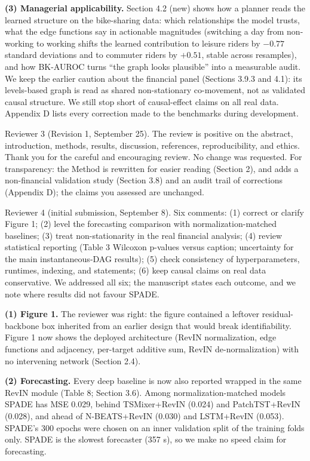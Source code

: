 \textbf{(3) Managerial applicability.} Section 4.2 (new) shows how a planner reads the learned structure on the bike-sharing data: which relationships the model trusts, what the edge functions say in actionable magnitudes (switching a day from non-working to working shifts the learned contribution to leisure riders by $-0.77$ standard deviations and to commuter riders by $+0.51$, stable across resamples), and how BK-AUROC turns ``the graph looks plausible'' into a measurable audit. We keep the earlier caution about the financial panel (Sections 3.9.3 and 4.1): its levels-based graph is read as shared non-stationary co-movement, not as validated causal structure. We still stop short of causal-effect claims on all real data. Appendix D lists every correction made to the benchmarks during development.
\item[R3] Reviewer 3 (Revision 1, September 25). The review is positive on the abstract, introduction, methods, results, discussion, references, reproducibility, and ethics.
Thank you for the careful and encouraging review. No change was requested. For transparency: the Method is rewritten for easier reading (Section 2), and adds a non-financial validation study (Section 3.8) and an audit trail of corrections (Appendix D); the claims you assessed are unchanged.
\item[R4] Reviewer 4 (initial submission, September 8). Six comments: (1) correct or clarify Figure 1; (2) level the forecasting comparison with normalization-matched baselines; (3) treat non-stationarity in the real financial analysis; (4) review statistical reporting (Table 3 Wilcoxon p-values versus caption; uncertainty for the main instantaneous-DAG results); (5) check consistency of hyperparameters, runtimes, indexing, and statements; (6) keep causal claims on real data conservative.
We addressed all six; the manuscript states each outcome, and we note where results did not favour SPADE.

\textbf{(1) Figure 1.} The reviewer was right: the figure contained a leftover residual-backbone box inherited from an earlier design that would break identifiability. Figure 1 now shows the deployed architecture (RevIN normalization, edge functions and adjacency, per-target additive sum, RevIN de-normalization) with no intervening network (Section 2.4).

\textbf{(2) Forecasting.} Every deep baseline is now also reported wrapped in the same RevIN module (Table 8; Section 3.6). Among normalization-matched models SPADE has MSE 0.029, behind TSMixer+RevIN (0.024) and PatchTST+RevIN (0.028), and ahead of N-BEATS+RevIN (0.030) and LSTM+RevIN (0.053). SPADE's 300 epochs were chosen on an inner validation split of the training folds only. SPADE is the slowest forecaster (357 s), so we make no speed claim for forecasting.

